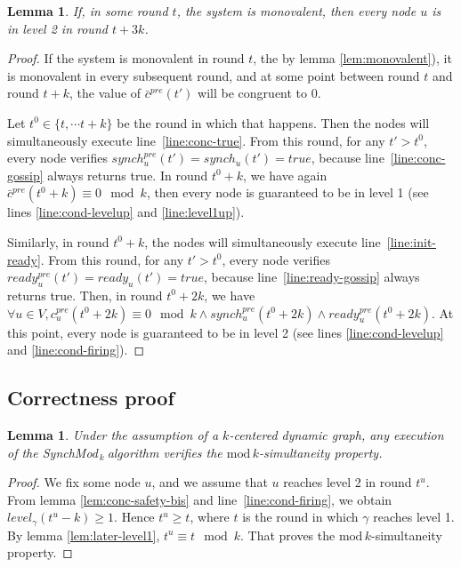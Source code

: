 \documentclass[11pt,letterpaper]{article}
\newtheorem{lem}[thm]{Lemma}
\newcommand{\cent}{\gamma}
\newcommand{\SM}{{\em SynchMod}$_{\,k}\ $}
\begin{document}
\begin{lem} \label{lem:termine}
	If, in some round $t$, the system is monovalent, then every node $u$ is in level 2 in round $t+3k$.
\end{lem}
\begin{proof}
	If the system is monovalent in round $t$, the by lemma \ref{lem:monovalent}), it is monovalent in every subsequent round, and
	at some point between round $t$ and round $t+k$, the value of $\bar c^{pre}(t')$ will be congruent to 0. 

	Let $t^0 \in \{t, \cdots t+k\}$ be the round in which that happens.
	Then the nodes will simultaneously execute line~\ref{line:conc-true}.
	From this round, for any $t' > t^0$, every node verifies $synch^{pre}_u(t') = synch_u(t') = true$, because line~\ref{line:conc-gossip} always returns true.
	In round $t^0+k$, we have again $\bar c^{pre}(t^0+k) \equiv 0 \mod k$, then every node is guaranteed to be in level 1 (see lines \ref{line:cond-levelup} and \ref{line:level1up}).

	Similarly, in round $t^0+k$, the nodes will simultaneously execute line~\ref{line:init-ready}.
	From this round, for any $t' > t^0$, every node verifies $ready^{pre}_u(t') = ready_u(t') = true$, because line~\ref{line:ready-gossip} always returns true.
	Then, in round $t^0+2k$, we have $\forall u \in V, c_u^{pre}(t^0+2k) \equiv 0 \mod k \wedge synch_u^{pre}(t^0+2k) \wedge ready_u^{pre}(t^0+2k)$.
	At this point, every node is guaranteed to be in level 2 (see lines \ref{line:cond-levelup} and \ref{line:cond-firing}).
\end{proof}

\subsection{Correctness proof}

\begin{lem} \label{lem:safety} 
	Under the assumption of a $k$-centered dynamic graph, 
	any execution of the \SM algorithm verifies the $\mathrm{mod}\,k$-simultaneity property.
\end{lem}
\begin{proof}
	We fix some node $u$, and we assume that $u$ reaches level 2 in round $t^u$.
	From lemma \ref{lem:conc-safety-bis} and line~\ref{line:cond-firing}, we obtain $level_\cent(t^u-k) \geq 1$.
	Hence $t^u \geq t$, where $t$ is the round in which $\cent$ reaches level 1.
	By lemma \ref{lem:later-level1}, $t^u \equiv t \mod k$.
	That proves the $\mathrm{mod}\,k$-simultaneity property.
\end{proof}
\end{document}

